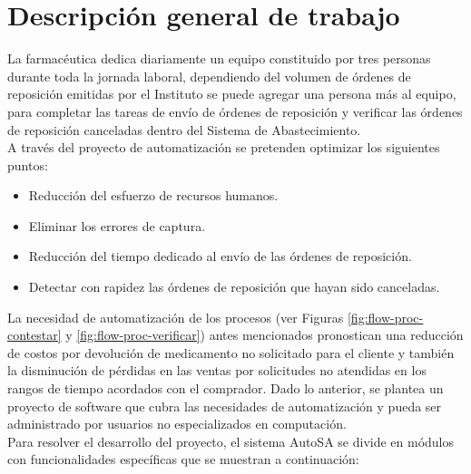 \section{Descripción general de trabajo}\label{sec:desc-general}
La farmacéutica dedica diariamente un equipo constituido por tres personas durante toda la jornada laboral, dependiendo del volumen de órdenes de reposición emitidas por el Instituto se puede agregar una persona más al equipo, para completar las tareas de envío de órdenes de reposición y verificar las órdenes de reposición canceladas dentro del Sistema de Abastecimiento.\\
A través del proyecto de automatización se pretenden optimizar los siguientes puntos:
\begin{itemize}
\item Reducción del esfuerzo de recursos humanos.
\item Eliminar los errores de captura.
\item Reducción del tiempo dedicado al envío de las órdenes de reposición.
\item Detectar con rapidez las órdenes de reposición que hayan sido canceladas.
\end{itemize}
La necesidad de automatización de los procesos (ver Figuras \ref{fig:flow-proc-contestar} y \ref{fig:flow-proc-verificar}) antes mencionados pronostican una reducción de costos por devolución de medicamento no solicitado para el cliente y también la disminución de pérdidas en las ventas por solicitudes no atendidas en los rangos de tiempo acordados con el comprador. Dado lo anterior, se plantea un proyecto de software que cubra las necesidades de automatización y pueda ser administrado por usuarios no especializados en computación.\\
Para resolver el desarrollo del proyecto, el sistema AutoSA se divide en módulos con funcionalidades específicas que se muestran a continuación:
